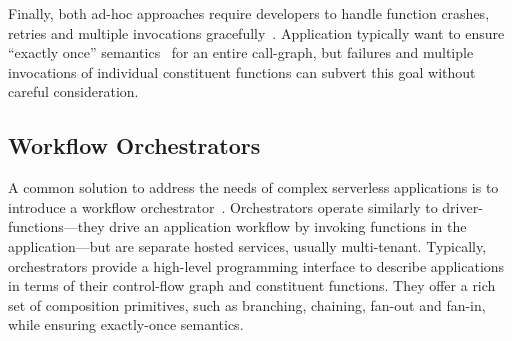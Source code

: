 Finally, both ad-hoc approaches require developers to handle function crashes,
retries and multiple invocations gracefully~\cite{aws-lambda-retry,
azure-functions-retry, aws-lambda-async-invoke,
azure-functions-exec-guarantee}. Application typically want to ensure
``exactly once'' semantics~\cite{netherite, beldi, boki,
formal-foundation-exec-gtnee, durable-semantics} for an entire call-graph, but
failures and multiple invocations of individual constituent functions can
subvert this goal without careful consideration.


\subsection{Workflow Orchestrators}\label{sec:bg:orchestrator}

A common solution to address the needs of complex serverless applications is
to introduce a workflow orchestrator~\cite{excamera, gg-atc,
aws-step-functions, google-cloud-composer, google-workflows,
durable-functions}.  Orchestrators operate similarly to
driver-functions---they drive an application workflow by invoking functions in
the application---but are separate hosted services, usually multi-tenant.
Typically, orchestrators provide a high-level programming interface to
describe applications in terms of their control-flow graph and constituent
functions.  They offer a  rich set of composition primitives, such as
branching, chaining, fan-out and fan-in, while ensuring exactly-once
semantics.


